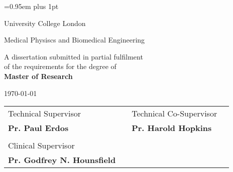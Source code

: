 \begin{titlepage}

\pagestyle{empty}


\vspace*{1.5cm}

\begin{center}
	{\LARGE{\theauthor}\par}
\end{center}
\vspace{0.6cm}
\begin{center}
        {\huge\baselineskip=0.95em plus 1pt \expandafter{
        \textbf{\thetitle}
        \par}}
\end{center}


\vspace{3cm}

\begin{center}
	\LARGE{\expandafter{\textrm{University College London}}}\par
	\expandafter{\Large{Medical Physiscs and Biomedical Engineering}\par}
\end{center}

\vspace{1.5cm}

\begin{center}
	A dissertation submitted in partial fulfilment 
	\\
	of the requirements for the degree of
	\\ 
	\textbf{Master of Research}	
\end{center}

\vspace{0.2cm}
\begin{center}
	\today
\end{center}

\vspace{1.0cm}

\begin{center}
\begin{tabular}{l p{3.3cm} l l}
	
Technical Supervisor & & Technical Co-Supervisor \\
\textbf{Pr. Paul Erdos} & & \textbf{Pr. Harold Hopkins}  \\
 & & \\
Clinical Supervisor & & \\
\textbf{Pr. Godfrey N. Hounsfield} & & 
	
\end{tabular}
\end{center}

\end{titlepage} 